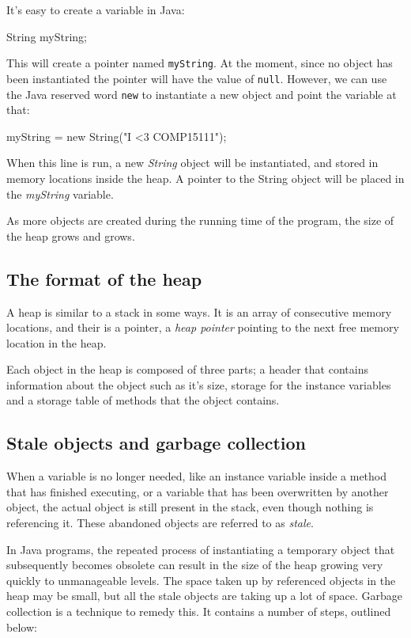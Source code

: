 It's easy to create a variable in Java:

\begin{listing}{1}
	String myString;
\end{listing}

This will create a pointer named {\tt myString}. At the moment, since no
object has been instantiated the pointer will have the value of {\tt null}.
However, we can use the Java reserved word {\tt new} to instantiate a new
object and point the variable at that:

\begin{listing}{1}
	myString = new String("I <3 COMP15111");
\end{listing}

When this line is run, a new {\it String} object will be instantiated, and
stored in memory locations inside the heap. A pointer to the String object
will be placed in the {\it myString} variable.

As more objects are created during the running time of the program, the size
of the heap grows and grows.

\subsection{The format of the heap}

A heap is similar to a stack in some ways. It is an array of consecutive
memory locations, and their is a pointer, a {\it heap pointer} pointing to the
next free memory location in the heap.

Each object in the heap is composed of three parts; a header that contains
information about the object such as it's size, storage for the instance
variables and a storage table of methods that the object contains.

\subsection{Stale objects and garbage collection}

When a variable is no longer needed, like an instance variable inside a method
that has finished executing, or a variable that has been overwritten by
another object, the actual object is still present in the stack, even though
nothing is referencing it. These abandoned objects are referred to as {\it
stale}.

In Java programs, the repeated process of instantiating a temporary object
that subsequently becomes obsolete can result in the size of the heap growing
very quickly to unmanageable levels. The space taken up by referenced objects
in the heap may be small, but all the stale objects are taking up a lot of
space. Garbage collection is a technique to remedy this. It contains a number
of steps, outlined below:

